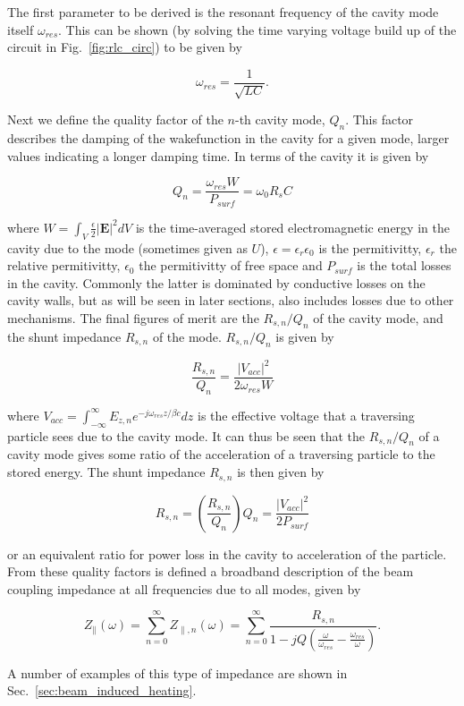 The first parameter to be derived is the resonant frequency of the cavity mode itself $\omega_{res}$. This can be shown (by solving the time varying voltage build up of the circuit in Fig.~\ref{fig:rlc_circ}) to be given by

\begin{equation}
\omega_{res} = \frac{1}{\sqrt{LC}}.
\end{equation}

Next we define the quality factor of the $n$-th cavity mode, $Q_{n}$. This factor describes the damping of the wakefunction in the cavity for a given mode, larger values indicating a longer damping time. In terms of the cavity it is given by

\begin{equation}
Q_{n} = \frac{\omega_{res} W}{P_{surf}} = \omega_{0}R_{s}C
\end{equation}

where $W = \int_{V} \frac{\epsilon}{2} \left| \mathbf{E} \right|^{2} dV$ is the time-averaged stored electromagnetic energy in the cavity due to the mode (sometimes given as $U$), $\epsilon = \epsilon_{r}\epsilon_{0}$ is the permitivitty, $\epsilon_{r}$ the relative permitivitty, $\epsilon_{0}$ the permitivitty of free space and $P_{surf}$ is the total losses in the cavity. Commonly the latter is dominated by conductive losses on the cavity walls, but as will be seen in later sections, also includes losses due to other mechanisms. The final figures of merit are the $R_{s, n}/Q_{n}$ of the cavity mode, and the shunt impedance $R_{s, n}$ of the mode. $R_{s, n}/Q_{n}$ is given by

\begin{equation}
\frac{R_{s, n}}{Q_{n}} = \frac{\left| V_{acc} \right|^{2}}{2 \omega_{res} W}
\end{equation}

where $V_{acc} = \int^{\infty}_{-\infty} E_{z, n} e^{-j \omega_{res} z/ \beta{}c} dz$ is the effective voltage that a traversing particle sees due to the cavity mode. It can thus be seen that the $R_{s, n}/Q_{n}$ of a cavity mode gives some ratio of the acceleration of a traversing particle to the stored energy. The shunt impedance $R_{s, n}$ is then given by

\begin{equation}
R_{s, n} = \left(  \frac{R_{s, n}}{Q_{n}} \right) Q_{n} = \frac{\left| V_{acc} \right|^{2}}{2 P_{surf}}
\end{equation}

or an equivalent ratio for power loss in the cavity to acceleration of the particle. From these quality factors is defined a broadband description of the beam coupling impedance at all frequencies due to all modes, given by

\begin{equation}
Z_{\parallel} \left( \omega \right) = \displaystyle\sum\limits_{n = 0}^{\infty} Z_{\parallel, n} \left( \omega \right) = \displaystyle\sum\limits_{n = 0}^{\infty} \frac{R_{s, n}}{1 - jQ \left( \frac{\omega}{\omega_{res}} - \frac{\omega_{res}}{\omega} \right)}.
\end{equation}

A number of examples of this type of impedance are shown in Sec.~\ref{sec:beam_induced_heating}.